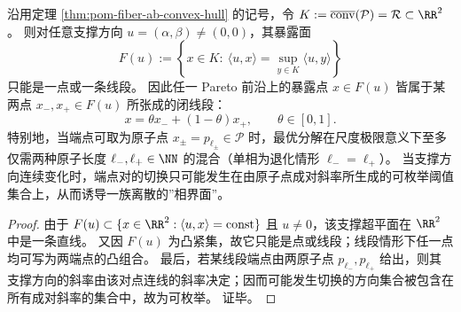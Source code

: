 \begin{corollary}\label{cor:pom-fiber-ab-two-phase-mixing}
沿用定理 \ref{thm:pom-fiber-ab-convex-hull} 的记号，令 \(K:=\overline{\mathrm{conv}}(\mathcal P)=\mathcal R\subset\RR^2\)。
则对任意支撑方向 \(u=(\alpha,\beta)\neq(0,0)\)，其暴露面
\[
F(u):=\left\{x\in K:\ \langle u,x\rangle=\sup_{y\in K}\langle u,y\rangle\right\}
\]
只能是一点或一条线段。
因此任一 Pareto 前沿上的暴露点 \(x\in F(u)\) 皆属于某两点 \(x_-,x_+\in F(u)\) 所张成的闭线段：
\[
x=\theta x_-+(1-\theta)x_+,\qquad \theta\in[0,1].
\]
特别地，当端点可取为原子点 \(x_\pm=p_{\ell_\pm}\in\mathcal P\) 时，最优分解在尺度极限意义下至多仅需两种原子长度 \(\ell_-,\ell_+\in\NN\) 的混合（单相为退化情形 \(\ell_-=\ell_+\)）。
当支撑方向连续变化时，端点对的切换只可能发生在由原子点成对斜率所生成的可枚举阈值集合上，从而诱导一族离散的”相界面”。
\end{corollary}
\begin{proof}
由于 \(F(u)\subset\{x\in\RR^2:\langle u,x\rangle=\mathrm{const}\}\) 且 \(u\neq 0\)，该支撑超平面在 \(\RR^2\) 中是一条直线。
又因 \(F(u)\) 为凸紧集，故它只能是点或线段；线段情形下任一点均可写为两端点的凸组合。
最后，若某线段端点由两原子点 \(p_{\ell_-},p_{\ell_+}\) 给出，则其支撑方向的斜率由该对点连线的斜率决定；因而可能发生切换的方向集合被包含在所有成对斜率的集合中，故为可枚举。
证毕。
\end{proof}
